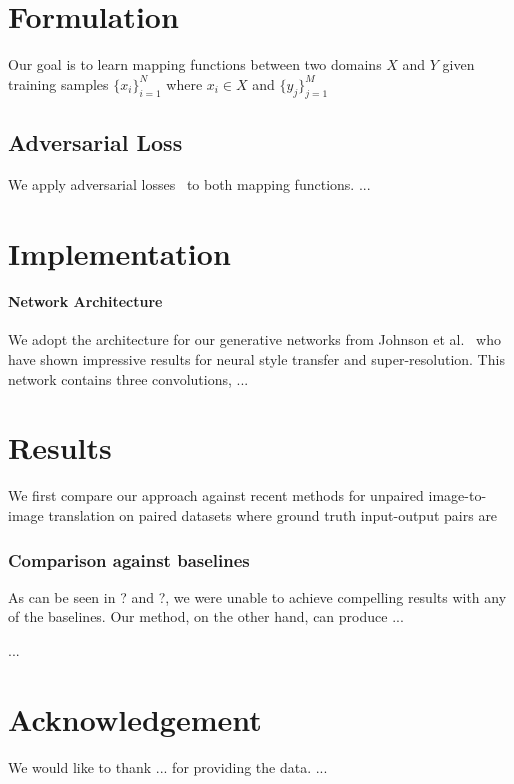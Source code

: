 \documentclass[10pt,letterpaper]{article}
\newcommand{\shortcite}[1]{\cite{#1}}
\begin{document}
\section{Formulation}
 


Our goal is to learn mapping functions between two domains $X$ and $Y$ given training samples $\{x_i\}_{i=1}^N$ where $x_i \in X$ and $\{y_j\}_{j=1}^M$  

\subsection{Adversarial Loss}
We apply adversarial losses~\cite{goodfellow2014generative} to both mapping functions.  
...


\section{Implementation}
 

\paragraph{Network Architecture}
We adopt the architecture for our generative networks from Johnson et al.~\shortcite{johnson2016perceptual} who have shown impressive results for neural style transfer and super-resolution. This network contains three convolutions,  
...


\section{Results}
 
We first compare our approach against recent methods for unpaired image-to-image translation on paired datasets where ground truth input-output pairs are  
 

\subsubsection{Comparison against baselines}
As can be seen in  ? and  ?, we were unable to achieve compelling results with any of the baselines. Our method, on the other hand, can produce ...

 
...

  \section{Acknowledgement}
We would like to thank ... for providing the data. ...
 
\end{document}
